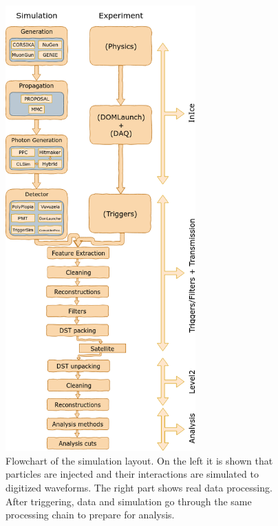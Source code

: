\begin{figure}
\centering
\includegraphics[width=0.65\textwidth]{chapter6/img/flowchart_extended.png}
\caption{Flowchart of the simulation layout. On the left it is shown that particles are injected and their interactions are simulated to digitized waveforms. The right part shows real data processing. After triggering, data and simulation go through the same processing chain to prepare for analysis.}
\label{fig:flowchart}
\end{figure}

